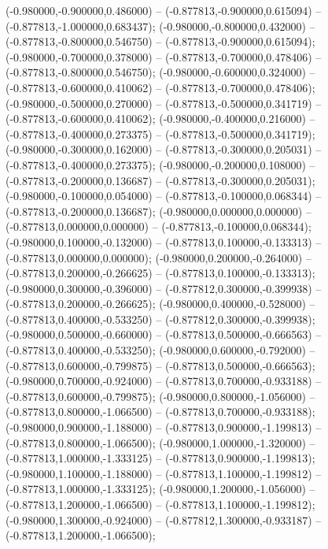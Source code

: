  (-0.980000,-0.900000,0.486000) -- (-0.877813,-0.900000,0.615094) -- (-0.877813,-1.000000,0.683437);
 (-0.980000,-0.800000,0.432000) -- (-0.877813,-0.800000,0.546750) -- (-0.877813,-0.900000,0.615094);
 (-0.980000,-0.700000,0.378000) -- (-0.877813,-0.700000,0.478406) -- (-0.877813,-0.800000,0.546750);
 (-0.980000,-0.600000,0.324000) -- (-0.877813,-0.600000,0.410062) -- (-0.877813,-0.700000,0.478406);
 (-0.980000,-0.500000,0.270000) -- (-0.877813,-0.500000,0.341719) -- (-0.877813,-0.600000,0.410062);
 (-0.980000,-0.400000,0.216000) -- (-0.877813,-0.400000,0.273375) -- (-0.877813,-0.500000,0.341719);
 (-0.980000,-0.300000,0.162000) -- (-0.877813,-0.300000,0.205031) -- (-0.877813,-0.400000,0.273375);
 (-0.980000,-0.200000,0.108000) -- (-0.877813,-0.200000,0.136687) -- (-0.877813,-0.300000,0.205031);
 (-0.980000,-0.100000,0.054000) -- (-0.877813,-0.100000,0.068344) -- (-0.877813,-0.200000,0.136687);
 (-0.980000,0.000000,0.000000) -- (-0.877813,0.000000,0.000000) -- (-0.877813,-0.100000,0.068344);
 (-0.980000,0.100000,-0.132000) -- (-0.877813,0.100000,-0.133313) -- (-0.877813,0.000000,0.000000);
 (-0.980000,0.200000,-0.264000) -- (-0.877813,0.200000,-0.266625) -- (-0.877813,0.100000,-0.133313);
 (-0.980000,0.300000,-0.396000) -- (-0.877812,0.300000,-0.399938) -- (-0.877813,0.200000,-0.266625);
 (-0.980000,0.400000,-0.528000) -- (-0.877813,0.400000,-0.533250) -- (-0.877812,0.300000,-0.399938);
 (-0.980000,0.500000,-0.660000) -- (-0.877813,0.500000,-0.666563) -- (-0.877813,0.400000,-0.533250);
 (-0.980000,0.600000,-0.792000) -- (-0.877813,0.600000,-0.799875) -- (-0.877813,0.500000,-0.666563);
 (-0.980000,0.700000,-0.924000) -- (-0.877813,0.700000,-0.933188) -- (-0.877813,0.600000,-0.799875);
 (-0.980000,0.800000,-1.056000) -- (-0.877813,0.800000,-1.066500) -- (-0.877813,0.700000,-0.933188);
 (-0.980000,0.900000,-1.188000) -- (-0.877813,0.900000,-1.199813) -- (-0.877813,0.800000,-1.066500);
 (-0.980000,1.000000,-1.320000) -- (-0.877813,1.000000,-1.333125) -- (-0.877813,0.900000,-1.199813);
 (-0.980000,1.100000,-1.188000) -- (-0.877813,1.100000,-1.199812) -- (-0.877813,1.000000,-1.333125);
 (-0.980000,1.200000,-1.056000) -- (-0.877813,1.200000,-1.066500) -- (-0.877813,1.100000,-1.199812);
 (-0.980000,1.300000,-0.924000) -- (-0.877812,1.300000,-0.933187) -- (-0.877813,1.200000,-1.066500);
